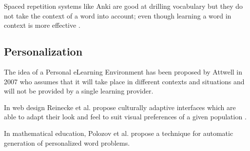 Spaced repetition systems like Anki are good at drilling vocabulary but they do not take the context of a word into account; even though learning a word in context is more effective \cite{nagy95-context}.

\subsection{Personalization}

The idea of a Personal eLearning Environment has been proposed by Attwell in 2007 \cite{Atwell07-personal} who assumes that it will take place in different contexts and situations and will not be provided by a single learning provider.

In web design Reinecke et al. propose culturally adaptive interfaces which are able to adapt their look and feel to suit visual preferences of a given population \cite{Reinecke13-CulturalAdaptation}. 

In mathematical education, Polozov et al. propose a technique for automatic generation of personalized word problems\cite{Polozov15-AdaptableMath}.










